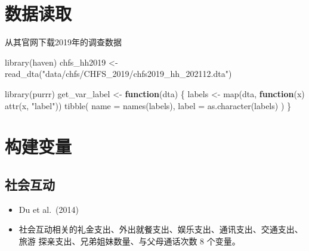\documentclass[
  oneside]{book}
\newenvironment{Shaded}{\begin{snugshade}}{\end{snugshade}}
\newcommand{\AttributeTok}[1]{\textcolor[rgb]{0.77,0.63,0.00}{#1}}
\newcommand{\ControlFlowTok}[1]{\textcolor[rgb]{0.13,0.29,0.53}{\textbf{#1}}}
\newcommand{\FunctionTok}[1]{\textcolor[rgb]{0.00,0.00,0.00}{#1}}
\newcommand{\NormalTok}[1]{#1}
\newcommand{\OtherTok}[1]{\textcolor[rgb]{0.56,0.35,0.01}{#1}}
\newcommand{\StringTok}[1]{\textcolor[rgb]{0.31,0.60,0.02}{#1}}
\begin{document}
\hypertarget{ux6570ux636eux8bfbux53d6}{%
\section{数据读取}\label{ux6570ux636eux8bfbux53d6}}

从其官网下载2019年的调查数据

\begin{Shaded}
\begin{Highlighting}[]
\FunctionTok{library}\NormalTok{(haven)}
\NormalTok{chfs\_hh2019 }\OtherTok{\textless{}{-}} \FunctionTok{read\_dta}\NormalTok{(}\StringTok{"data/chfs/CHFS\_2019/chfs2019\_hh\_202112.dta"}\NormalTok{)}
\end{Highlighting}
\end{Shaded}

\begin{Shaded}
\begin{Highlighting}[]
\FunctionTok{library}\NormalTok{(purrr)}
\NormalTok{get\_var\_label }\OtherTok{\textless{}{-}} \ControlFlowTok{function}\NormalTok{(dta) \{}
\NormalTok{  labels }\OtherTok{\textless{}{-}} \FunctionTok{map}\NormalTok{(dta, }\ControlFlowTok{function}\NormalTok{(x) }\FunctionTok{attr}\NormalTok{(x, }\StringTok{"label"}\NormalTok{))}
  \FunctionTok{tibble}\NormalTok{(}
    \AttributeTok{name =} \FunctionTok{names}\NormalTok{(labels),}
    \AttributeTok{label =} \FunctionTok{as.character}\NormalTok{(labels)}
\NormalTok{  )}
\NormalTok{\}}
\end{Highlighting}
\end{Shaded}

\hypertarget{ux6784ux5efaux53d8ux91cf}{%
\section{构建变量}\label{ux6784ux5efaux53d8ux91cf}}

\hypertarget{ux793eux4f1aux4e92ux52a8}{%
\subsection{社会互动}\label{ux793eux4f1aux4e92ux52a8}}

\begin{itemize}
\item
  Du et al.~(2014)
\item
  社会互动相关的礼金支出、外出就餐支出、娱乐支出、通讯支出、交通支出、旅游
  探亲支出、兄弟姐妹数量、与父母通话次数 8 个变量。
\end{itemize}
\end{document}
